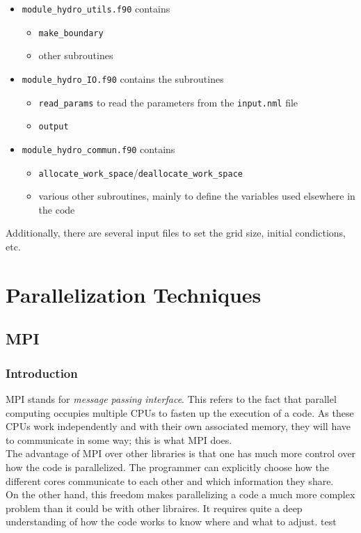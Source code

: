 \documentclass[12pt, a4paper, titlepage]{article}
\newcounter{def}
\begin{document}
{\begin{itemize}
\begin{itemize}
\begin{itemize}
		\end{itemize}
	\end{itemize}
	\item \texttt{module\_hydro\_utils.f90} contains
	\begin{itemize}
		\item \texttt{make\_boundary}
		\item other subroutines
	\end{itemize}
	\item \texttt{module\_hydro\_IO.f90} contains the subroutines
	\begin{itemize}
		\item \texttt{read\_params} to read the parameters from the \texttt{input.nml} file
		\item \texttt{output}
	\end{itemize}
	\item \texttt{module\_hydro\_commun.f90} contains 
	\begin{itemize}
		\item \texttt{allocate\_work\_space}/\texttt{deallocate\_work\_space}
		\item various other subroutines, mainly to define the variables used elsewhere in the code
	\end{itemize}		
\end{itemize}

Additionally, there are several input files to set the grid size, initial condictions, etc.








\section{Parallelization Techniques}
\subsection{MPI}

\subsubsection{Introduction}
MPI stands for \textit{message passing interface}. This refers to the fact that parallel computing occupies multiple CPUs to fasten up the execution of a code. As these CPUs work independently and with their own associated memory, they will have to communicate in some way; this is what MPI does.\\
The advantage of MPI over other libraries is that one has much more control over how the code is parallelized. The programmer can explicitly choose how the different cores communicate to each other and which information they share.\\
On the other hand, this freedom makes parallelizing a code a much more complex problem than it could be with other libraires. It requires quite a deep understanding of how the code works to know where and what to adjust. test


}
\end{document}
